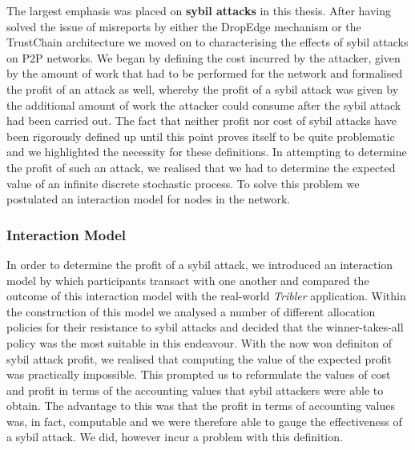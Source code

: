 \noindent{}The largest emphasis was placed on \textbf{sybil attacks} in this thesis. After having solved the issue of misreports by either the DropEdge mechanism or the TrustChain architecture we moved on to characterising the effects of sybil attacks on P2P networks. We began by defining the cost incurred by the attacker, given by the amount of work that had to be performed for the network and formalised the profit of an attack as well, whereby the profit of a sybil attack was given by the additional amount of work the attacker could consume after the sybil attack had been carried out. The fact that neither profit nor cost of sybil attacks have been rigorously defined up until this point proves itself to be quite problematic and we highlighted the necessity for these definitions. In attempting to determine the profit of such an attack, we realised that we had to determine the expected value of an infinite discrete stochastic process. To solve this problem we postulated an interaction model for nodes in the network. \vspace{1em}\\ 


\subsubsection*{Interaction Model}
\label{subsubsec:Interaction Model}
\noindent{}In order to determine the profit of a sybil attack, we introduced an interaction model by which participants transact with one another and compared the outcome of this interaction model with the real-world {\it Tribler} application. Within the construction of this model we analysed a number of different allocation policies for their resistance to sybil attacks and decided that the winner-takes-all policy was the most suitable in this endeavour. With the now won definiton of sybil attack profit, we realised that computing the value of the expected profit was practically impossible. This prompted us to reformulate the values of cost and profit in terms of the accounting values that sybil attackers were able to obtain. The advantage to this was that the profit in terms of accounting values was, in fact, computable and we were therefore able to gauge the effectiveness of a sybil attack. We did, however incur a problem with this definition. \vspace{1em}\\



